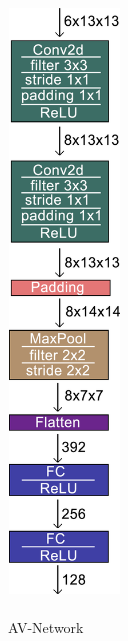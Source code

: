 \begin{figure}
	\centering
	\includegraphics[width=3.0cm, height=15.5cm]{Abbildungen/ConvNet.png}
	\caption[AV-Network]{\\AV-Network}
	\label{fig:AV-Network}
\end{figure}

